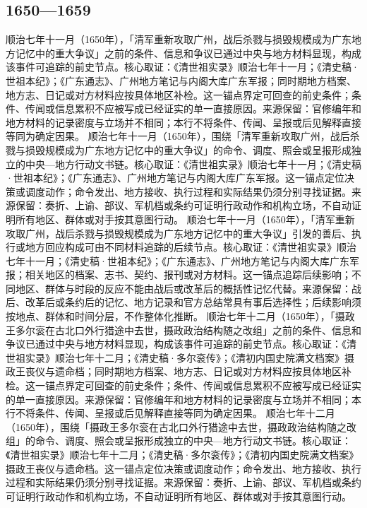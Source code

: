 \subsection{1650—1659}
顺治七年十一月（1650年），「清军重新攻取广州，战后杀戮与损毁规模成为广东地方记忆中的重大争议」之前的条件、信息和争议已通过中央与地方材料显现，构成该事件可追踪的前史节点。核心取证：《清世祖实录》顺治七年十一月；《清史稿·世祖本纪》；《广东通志》、广州地方笔记与内阁大库广东军报；同时期地方档案、地方志、日记或对方材料应按具体地区补检。这一锚点界定可回查的前史条件；条件、传闻或信息累积不应被写成已经证实的单一直接原因。来源保留：官修编年和地方材料的记录密度与立场并不相同；本行不将条件、传闻、呈报或后见解释直接等同为确定因果。
顺治七年十一月（1650年），围绕「清军重新攻取广州，战后杀戮与损毁规模成为广东地方记忆中的重大争议」的命令、调度、照会或呈报形成独立的中央—地方行动文书链。核心取证：《清世祖实录》顺治七年十一月；《清史稿·世祖本纪》；《广东通志》、广州地方笔记与内阁大库广东军报。这一锚点定位决策或调度动作；命令发出、地方接收、执行过程和实际结果仍须分别寻找证据。来源保留：奏折、上谕、部议、军机档或条约可证明行政动作和机构立场，不自动证明所有地区、群体或对手按其意图行动。
顺治七年十一月（1650年），「清军重新攻取广州，战后杀戮与损毁规模成为广东地方记忆中的重大争议」引发的善后、执行或地方回应构成可由不同材料追踪的后续节点。核心取证：《清世祖实录》顺治七年十一月；《清史稿·世祖本纪》；《广东通志》、广州地方笔记与内阁大库广东军报；相关地区的档案、志书、契约、报刊或对方材料。这一锚点追踪后续影响；不同地区、群体与时段的反应不能由战后或改革后的概括性记忆代替。来源保留：战后、改革后或条约后的记忆、地方记录和官方总结常具有事后选择性；后续影响须按地点、群体和时间分层，不作整体化推断。
顺治七年十二月（1650年），「摄政王多尔衮在古北口外行猎途中去世，摄政政治结构随之改组」之前的条件、信息和争议已通过中央与地方材料显现，构成该事件可追踪的前史节点。核心取证：《清世祖实录》顺治七年十二月；《清史稿·多尔衮传》；《清初内国史院满文档案》摄政王丧仪与遗命档；同时期地方档案、地方志、日记或对方材料应按具体地区补检。这一锚点界定可回查的前史条件；条件、传闻或信息累积不应被写成已经证实的单一直接原因。来源保留：官修编年和地方材料的记录密度与立场并不相同；本行不将条件、传闻、呈报或后见解释直接等同为确定因果。
顺治七年十二月（1650年），围绕「摄政王多尔衮在古北口外行猎途中去世，摄政政治结构随之改组」的命令、调度、照会或呈报形成独立的中央—地方行动文书链。核心取证：《清世祖实录》顺治七年十二月；《清史稿·多尔衮传》；《清初内国史院满文档案》摄政王丧仪与遗命档。这一锚点定位决策或调度动作；命令发出、地方接收、执行过程和实际结果仍须分别寻找证据。来源保留：奏折、上谕、部议、军机档或条约可证明行政动作和机构立场，不自动证明所有地区、群体或对手按其意图行动。
